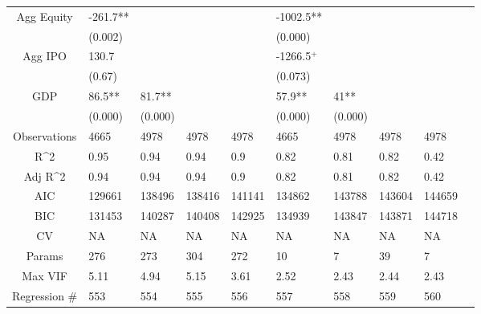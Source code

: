 \documentclass{article}
\begin{document}
\begin{table}[H]
\begin{tabular}{|clllllllll|}
  Agg Equity & -261.7** &  &  &  & -1002.5** &  &  &  & \\ 
   & (0.002) &  &  &  & (0.000) &  &  &  & \\ 
  Agg IPO & 130.7 &  &  &  & -1266.5$^{+}$ &  &  &  & \\ 
   & (0.67) &  &  &  & (0.073) &  &  &  & \\ 
  GDP & 86.5** & 81.7** &  &  & 57.9** & 41** &  &  & \\ 
   & (0.000) & (0.000) &  &  & (0.000) & (0.000) &  &  & \\ 
  \hline 
 Observations & 4665 & 4978 & 4978 & 4978 & 4665 & 4978 & 4978 & 4978 & \\ 
  R^2 & 0.95 & 0.94 & 0.94 & 0.9 & 0.82 & 0.81 & 0.82 & 0.42 & \\ 
  Adj R^2 & 0.94 & 0.94 & 0.94 & 0.9 & 0.82 & 0.81 & 0.82 & 0.42 & \\ 
  AIC & 129661 & 138496 & 138416 & 141141 & 134862 & 143788 & 143604 & 144659 & \\ 
  BIC & 131453 & 140287 & 140408 & 142925 & 134939 & 143847 & 143871 & 144718 & \\ 
  CV & NA & NA & NA & NA & NA & NA & NA & NA & \\ 
  Params & 276 & 273 & 304 & 272 & 10 & 7 & 39 & 7 & \\ 
  Max VIF & 5.11 & 4.94 & 5.15 & 3.61 & 2.52 & 2.43 & 2.44 & 2.43 & \\ 
  Regression \# & 553 & 554 & 555 & 556 & 557 & 558 & 559 & 560 & \\ 
   \hline
\end{tabular}
 
\end{table}
\end{document}
